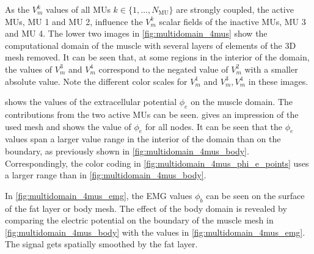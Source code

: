As the $V_m^k$ values of all MUs $k\in \{1,\dots,N_\text{MU}\}$ are strongly coupled, the active MUs, MU 1 and MU 2, influence the $V_m^k$ scalar fields of the inactive MUs, MU 3 and MU 4. The lower two images in \cref{fig:multidomain_4mus} show the computational domain of the muscle with several layers of elements of the 3D mesh removed. 
It can be seen that, at some regions in the interior of the domain, the values of $V_m^3$ and $V_m^4$ correspond to the negated value of $V_m^2$ with a smaller absolute value. Note the different color scales for $V_m^1$ and $V_m^3,V_m^4$ in these images.

 shows the values of the extracellular potential $\phi_e$ on the muscle domain. The contributions from the two active MUs can be seen. 
 gives an impression of the used mesh and shows the value of $\phi_e$ for all nodes. It can be seen that the $\phi_e$ values span a larger value range in the interior of the domain than on the boundary, as previously shown in \cref{fig:multidomain_4mus_body}. Correspondingly, the color coding in \cref{fig:multidomain_4mus_phi_e_points} uses a larger range than in \cref{fig:multidomain_4mus_body}.

In \cref{fig:multidomain_4mus_emg}, the EMG values $\phi_b$ can be seen on the surface of the fat layer or body mesh. The effect of the body domain is revealed by comparing the electric potential on the boundary of the muscle mesh in \cref{fig:multidomain_4mus_body} with the values in \cref{fig:multidomain_4mus_emg}. The signal gets spatially smoothed by the fat layer.


